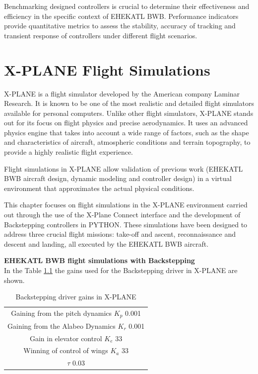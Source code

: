 Benchmarking designed controllers is crucial to determine their effectiveness and efficiency in the specific context of EHEKATL BWB. Performance indicators provide quantitative metrics to assess the stability, accuracy of tracking and transient response of controllers under different flight scenarios.


\chapter{X-PLANE Flight Simulations}

X-PLANE is a flight simulator developed by the American company Laminar Research. It is known to be one of the most realistic and detailed flight simulators available for personal computers.
%
Unlike other flight simulators, X-PLANE stands out for its focus on flight physics and precise aerodynamics. It uses an advanced physics engine that takes into account a wide range of factors, such as the shape and characteristics of aircraft, atmospheric conditions and terrain topography, to provide a highly realistic flight experience.

Flight simulations in X-PLANE allow validation of previous work (EHEKATL BWB aircraft design, dynamic modeling and controller design) in a virtual environment that approximates the actual physical conditions. 

This chapter focuses on flight simulations in the X-PLANE environment carried out through the use of the X-Plane Connect interface and the development of Backstepping controllers in PYTHON. These simulations have been designed to address three crucial flight missions: take-off and ascent, reconnaissance and descent and landing, all executed by the EHEKATL BWB aircraft.

\medskip

\textbf{EHEKATL BWB flight simulations with Backstepping}\\
In the Table \ref{Ganancias de controlador Backstepping en X-Plane} the gains used for the Backstepping driver in X-PLANE are shown. 
\begin{table}[!h]
    \caption{Backstepping driver gains in X-PLANE}
    \centering
    \begin{tabular}{|c|}
    \hline
     Gaining from the pitch dynamics $K_p$ 0.001 \\
    Gaining from the Alabeo Dynamics $K_r$ 0.001 \\
    Gain in elevator control $K_e$ 33 \\
    Winning of control of wings $K_a$ 33 \\
    $\tau$ 0.03 \\
    \hline
    \end{tabular}

    \label{Ganancias de controlador Backstepping en X-Plane}
\end{table}

